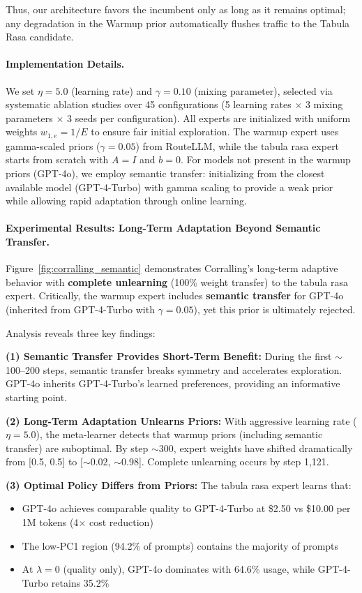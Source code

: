 Thus, our architecture favors the incumbent only as long as it remains optimal; any degradation in the Warmup prior automatically flushes traffic to the Tabula Rasa candidate.

\paragraph{Implementation Details.}
We set $\eta = 5.0$ (learning rate) and $\gamma = 0.10$ (mixing parameter), selected via systematic ablation studies over 45 configurations (5 learning rates $\times$ 3 mixing parameters $\times$ 3 seeds per configuration).
All experts are initialized with uniform weights $w_{1,e} = 1/E$ to ensure fair initial exploration.
The warmup expert uses gamma-scaled priors ($\gamma=0.05$) from RouteLLM, while the tabula rasa expert starts from scratch with $A = I$ and $b = 0$.
For models not present in the warmup priors (GPT-4o), we employ semantic transfer: initializing from the closest available model (GPT-4-Turbo) with gamma scaling to provide a weak prior while allowing rapid adaptation through online learning.

\paragraph{Experimental Results: Long-Term Adaptation Beyond Semantic Transfer.}
Figure~\ref{fig:corralling_semantic} demonstrates Corralling's long-term adaptive behavior with \textbf{complete unlearning} (100\% weight transfer) to the tabula rasa expert.
Critically, the warmup expert includes \textbf{semantic transfer} for GPT-4o (inherited from GPT-4-Turbo with $\gamma=0.05$), yet this prior is ultimately rejected.

Analysis reveals three key findings:

\textbf{(1) Semantic Transfer Provides Short-Term Benefit:} During the first $\sim$100--200 steps, semantic transfer breaks symmetry and accelerates exploration. GPT-4o inherits GPT-4-Turbo's learned preferences, providing an informative starting point.

\textbf{(2) Long-Term Adaptation Unlearns Priors:} With aggressive learning rate ($\eta=5.0$), the meta-learner detects that warmup priors (including semantic transfer) are suboptimal. By step $\sim$300, expert weights have shifted dramatically from [0.5, 0.5] to [$\sim$0.02, $\sim$0.98]. Complete unlearning occurs by step 1,121.

\textbf{(3) Optimal Policy Differs from Priors:} The tabula rasa expert learns that:
\begin{itemize}[nosep]
    \item GPT-4o achieves comparable quality to GPT-4-Turbo at \$2.50 vs \$10.00 per 1M tokens (4$\times$ cost reduction)
    \item The low-PC1 region (94.2\% of prompts) contains the majority of prompts
    \item At $\lambda=0$ (quality only), GPT-4o dominates with 64.6\% usage, while GPT-4-Turbo retains 35.2\%
\end{itemize}

